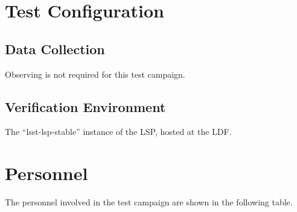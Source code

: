 \documentclass[DM,STR,toc]{lsstdoc}
\begin{document}
\section{Test Configuration}
\label{sect:configuration}

\subsection{Data Collection}

  Observing is not required for this test campaign.

\subsection{Verification Environment}
\label{sect:hwconf}
  The ``lsst-lsp-stable'' instance of the LSP, hosted at the LDF.





\newpage
\section{Personnel}
\label{sect:personnel}

The personnel involved in the test campaign are shown in the following table.
\end{document}
